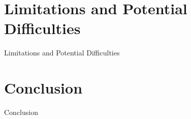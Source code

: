 \documentclass{report}
\def\backmatter{%
    \setcounter{section}{0}
    \renewcommand{\thesection}{\Alph{section}}
}%
\begin{document}
\chapter{Limitations and Potential Difficulties}\label{chap:limitations}
Limitations and Potential Difficulties

\chapter{Conclusion}\label{chap:conclusion}
Conclusion

\backmatter

\printbibliography
\end{document}
